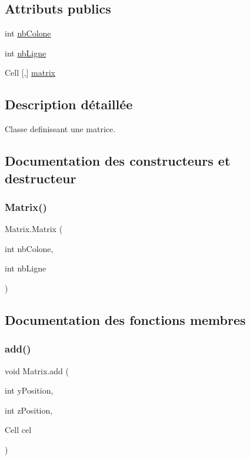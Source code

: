 \subsection*{Attributs publics}
\begin{DoxyCompactItemize}
\item 
int \mbox{\hyperlink{class_matrix_a4b79d8649f64d752e88114a86dc6a91b}{nb\+Colone}}
\item 
int \mbox{\hyperlink{class_matrix_ac6dd4dae973f7c67ae6fd6c2938d9ac5}{nb\+Ligne}}
\item 
Cell \mbox{[},\mbox{]} \mbox{\hyperlink{class_matrix_a4733446eb00eb5c1b56955185354bc00}{matrix}}
\end{DoxyCompactItemize}


\subsection{Description détaillée}
Classe definissant une matrice. 



\subsection{Documentation des constructeurs et destructeur}
\mbox{\label{class_matrix_a7fc9206cb63f27154b47f5a4d7e413f0}} 
\subsubsection{\texorpdfstring{Matrix()}{Matrix()}}
{\footnotesize\ttfamily Matrix.\+Matrix (\begin{DoxyParamCaption}\item[{int}]{nb\+Colone,  }\item[{int}]{nb\+Ligne }\end{DoxyParamCaption})\hspace{0.3cm}{\ttfamily [inline]}}



\subsection{Documentation des fonctions membres}
\mbox{\label{class_matrix_aa3ca21c6dd7c9a3b69d53e35c4cdebf3}} 
\subsubsection{\texorpdfstring{add()}{add()}}
{\footnotesize\ttfamily void Matrix.\+add (\begin{DoxyParamCaption}\item[{int}]{y\+Position,  }\item[{int}]{z\+Position,  }\item[{Cell}]{cel }\end{DoxyParamCaption})\hspace{0.3cm}{\ttfamily [inline]}}



